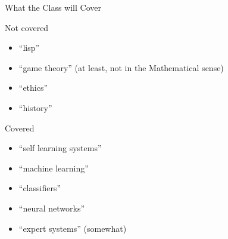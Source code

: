 \documentclass[14pt]{beamer}
\begin{document}
\begin{frame}{What the Class will Cover}
\begin{block}{Not covered}
\begin{itemize}
\item ``lisp''
\item ``game theory'' (at least, not in the Mathematical sense)
\item ``ethics''
\item ``history''
\end{itemize}
\end{block}
\begin{block}{Covered}
\begin{itemize}
\item ``self learning systems''
\item ``machine learning''
\item ``classifiers''
\item ``neural networks''
\item ``expert systems'' (somewhat)
\end{itemize}
\end{block}
\end{frame}
\end{document}
